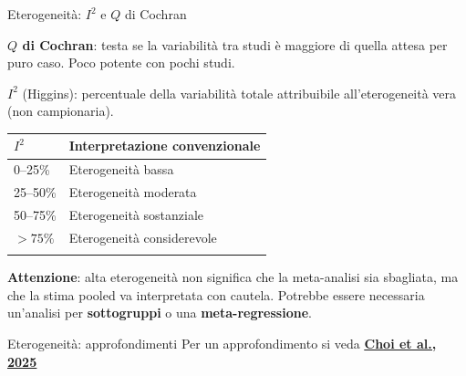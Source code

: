 \documentclass[
  ignorenonframetext,
]{beamer}
\begin{document}
\begin{frame}{Eterogeneità: \(I^2\) e \(Q\) di Cochran}
\label{eterogeneituxe0-i2-e-q-di-cochran}
\small

\textbf{\(Q\) di Cochran}: testa se la variabilità tra studi è maggiore
di quella attesa per puro caso. Poco potente con pochi studi.

\vspace{0.3em}

\textbf{\(I^2\)} (Higgins): percentuale della variabilità totale
attribuibile all'eterogeneità vera (non campionaria).

\vspace{0.3em}

\begin{longtable}[]{@{}ll@{}}
\toprule\noalign{}
\(I^2\) & Interpretazione convenzionale \\
\midrule\noalign{}
\endhead
\footnotesize 0--25\% & \footnotesize Eterogeneità bassa \\
\footnotesize 25--50\% & \footnotesize Eterogeneità moderata \\
\footnotesize 50--75\% & \footnotesize Eterogeneità sostanziale \\
\footnotesize \(>75\%\) & \footnotesize Eterogeneità considerevole \\
\bottomrule\noalign{}
\end{longtable}

\vspace{0.3em}

\small \textbf{Attenzione}: alta eterogeneità non significa che la
meta-analisi sia sbagliata, ma che la stima pooled va interpretata con
cautela. Potrebbe essere necessaria un'analisi per \textbf{sottogruppi}
o una \textbf{meta-regressione}.
\end{frame}

\begin{frame}{Eterogeneità: approfondimenti}
\label{eterogeneituxe0-approfondimenti}
Per un approfondimento si veda
\href{https://pmc.ncbi.nlm.nih.gov/articles/PMC12326561/}{\underline{\textbf{Choi et al., 2025}}}
\end{frame}
\end{document}
